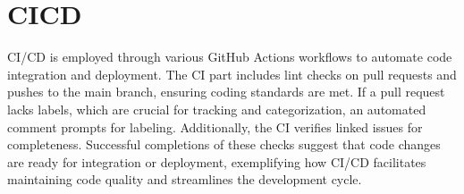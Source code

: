 \documentclass{article}
\begin{document}
\section{CICD}

CI/CD is employed through various GitHub Actions workflows to automate code integration and deployment. The CI part includes lint checks on pull requests and pushes to the main branch, ensuring coding standards are met. If a pull request lacks labels, which are crucial for tracking and categorization, an automated comment prompts for labeling. Additionally, the CI verifies linked issues for completeness. Successful completions of these checks suggest that code changes are ready for integration or deployment, exemplifying how CI/CD facilitates maintaining code quality and streamlines the development cycle.
\end{document}
